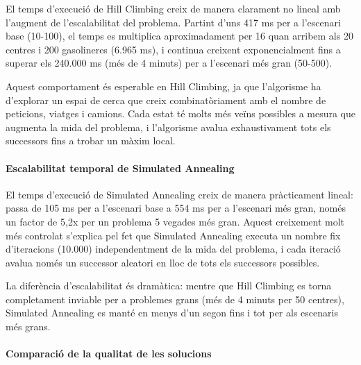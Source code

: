 \vspace{0.5cm}

\vspace{0.5cm}

El temps d'execució de Hill Climbing creix de manera clarament no lineal amb l'augment de l'escalabilitat del problema. Partint d'uns 417 ms per a l'escenari base (10-100), el temps es multiplica aproximadament per 16 quan arribem als 20 centres i 200 gasolineres (6.965 ms), i continua creixent exponencialment fins a superar els 240.000 ms (més de 4 minuts) per a l'escenari més gran (50-500).

Aquest comportament és esperable en Hill Climbing, ja que l'algorisme ha d'explorar un espai de cerca que creix combinatòriament amb el nombre de peticions, viatges i camions. Cada estat té molts més veïns possibles a mesura que augmenta la mida del problema, i l'algorisme avalua exhaustivament tots els successors fins a trobar un màxim local.

\paragraph{Escalabilitat temporal de Simulated Annealing}

\vspace{0.5cm}

\vspace{0.5cm}

El temps d'execució de Simulated Annealing creix de manera pràcticament lineal: passa de 105 ms per a l'escenari base a 554 ms per a l'escenari més gran, només un factor de 5,2x per un problema 5 vegades més gran. Aquest creixement molt més controlat s'explica pel fet que Simulated Annealing executa un nombre fix d'iteracions (10.000) independentment de la mida del problema, i cada iteració avalua només un successor aleatori en lloc de tots els successors possibles.

La diferència d'escalabilitat és dramàtica: mentre que Hill Climbing es torna completament inviable per a problemes grans (més de 4 minuts per 50 centres), Simulated Annealing es manté en menys d'un segon fins i tot per als escenaris més grans.

\paragraph{Comparació de la qualitat de les solucions}

\vspace{0.5cm}

\vspace{0.5cm}

